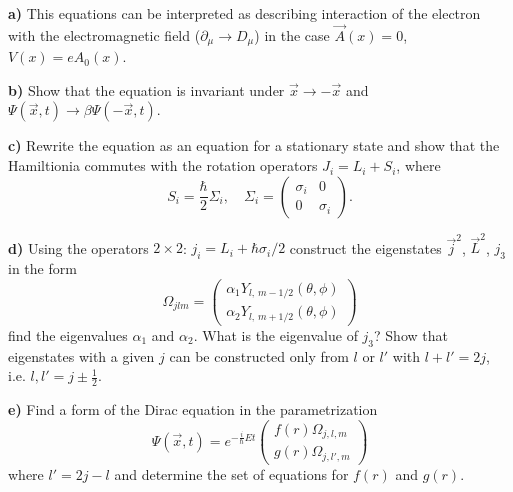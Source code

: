 \documentclass[a4paper,11pt]{article}
\begin{document}
\begin{enumerate}
  \textbf{a)} This equations can be interpreted as describing
  interaction of the electron with the electromagnetic field
  ($\partial_{ \mu } \to D_{ \mu }$) in the case $\vec{ A }( x ) = 0$,
  $V( x ) = e A_{ 0 }( x )$.

  \textbf{b)} Show that the equation is invariant under
  $\vec{ x } \to -\vec{ x }$ and
  $\Psi( \vec{ x }, t ) \to \beta \Psi( -\vec{ x }, t )$.

  \textbf{c)} Rewrite the equation as an equation for a stationary
  state and show that the Hamiltionia commutes with the rotation
  operators $J_{ i } = L_{ i } + S_{ i }$, where
  \begin{equation}
    \label{QM:21}
    S_{ i } = \frac{ \hbar }{ 2 } \Sigma_{ i }, \quad
    \Sigma_{ i }
    =
    \begin{pmatrix}
      \sigma_{ i } & 0 \\
      0 & \sigma_{ i }
    \end{pmatrix}.
  \end{equation}

  \textbf{d)} Using the operators $2 \times 2$:
  $j_{ i } = L_{ i } + \hbar \sigma_{ i } / 2$ construct the
  eigenstates $\vec{ j }^{ 2 }$, $\vec{ L }^{ 2 }$, $j_{ 3 }$ in the
  form
  \begin{equation}
    \label{QM:22}
    \Omega_{ j l m } =
    \begin{pmatrix}
      \alpha_{ 1 } Y_{ l, \, m - 1/2 }( \theta, \phi ) \\
      \alpha_{ 2 } Y_{ l, \, m + 1/2 }( \theta, \phi )
    \end{pmatrix}
  \end{equation}
  find the eigenvalues $\alpha_{ 1 }$ and $\alpha_{ 2 }$. What is the
  eigenvalue of $j_{ 3 }$? Show that eigenstates with a given $j$ can
  be constructed only from $l$ or $l'$ with $l + l' = 2j$, i.e.
  $l, l' = j \pm \frac{ 1 }{ 2 }$.

  \textbf{e)} Find a form of the Dirac equation in the parametrization
  \begin{equation}
    \label{QM:23}
    \Psi( \vec{ x }, t ) =
    e^{ -\frac{ i }{ \hbar } E t }
    \begin{pmatrix}
      f( r ) \Omega_{ j, l, m } \\
      g( r ) \Omega_{ j, l', m }
    \end{pmatrix}
  \end{equation}
  where $l' = 2j - l$ and determine the set of equations for $f( r )$
  and $g( r )$.


\end{enumerate}
\end{document}
